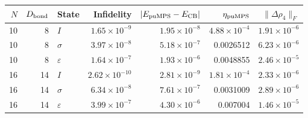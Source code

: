 \begin{tabular}{rrlrrrr}\toprule
$N$ & $D_{\rm bond}$ & State & Infidelity & $|E_{\rm puMPS}-E_{\rm CB}|$ & $\eta_{\rm puMPS}$ & $\|\Delta\rho_4\|_F$\\\midrule
10 & 8 & $I$ & $1.65\!\times\!10^{-9}$ & $1.95\!\times\!10^{-8}$ & $4.88\!\times\!10^{-4}$ & $1.91\!\times\!10^{-6}$ \\
10 & 8 & $\sigma$ & $3.97\!\times\!10^{-8}$ & $5.18\!\times\!10^{-7}$ & 0.0026512 & $6.23\!\times\!10^{-6}$ \\
10 & 8 & $\varepsilon$ & $1.64\!\times\!10^{-7}$ & $1.93\!\times\!10^{-6}$ & 0.0048855 & $2.46\!\times\!10^{-5}$ \\
16 & 14 & $I$ & $2.62\!\times\!10^{-10}$ & $2.81\!\times\!10^{-9}$ & $1.81\!\times\!10^{-4}$ & $2.33\!\times\!10^{-6}$ \\
16 & 14 & $\sigma$ & $6.34\!\times\!10^{-8}$ & $7.61\!\times\!10^{-7}$ & 0.0031009 & $2.89\!\times\!10^{-6}$ \\
16 & 14 & $\varepsilon$ & $3.99\!\times\!10^{-7}$ & $4.30\!\times\!10^{-6}$ & 0.007004 & $1.46\!\times\!10^{-5}$ \\
\bottomrule\end{tabular}
